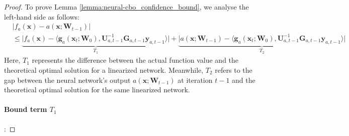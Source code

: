 \begin{proof}
To prove Lemma \ref{lemma:neural-cbo_confidence_bound}, we analyse the left-hand side as follows:
\begin{align*}
    & \lvert f_a(\mathbf{x}) - a(\mathbf{x}; \mathbf{W}_{t-1}) \rvert 
    \\
    & \le \underbrace{\lvert f_a(\mathbf{x}) - \langle \mathbf{g}_a(\mathbf{x}_{t};\mathbf{W}_{0}),\mathbf{U}_{a,t-1}^{-1}\mathbf{G}_{a,t-1}\mathbf{y}_{a,t-1} \rangle  \rvert}_{T_1} + \underbrace{\lvert a(\mathbf{x}; \mathbf{W}_{t-1}) - \langle \mathbf{g}_a(\mathbf{x}_{t};\mathbf{W}_{0}),\mathbf{U}_{a,t-1}^{-1}\mathbf{G}_{a,t-1}\mathbf{y}_{a,t-1} \rangle  \rvert}_{T_2}
\end{align*}
Here, $T_1$ represents the difference between the actual function value and the theoretical optimal solution for a linearized network. Meanwhile, $T_2$ refers to the gap between the neural network's output $a(\mathbf{x}; \boldsymbol{W}_{t-1})$ at iteration $t-1$ and the theoretical optimal solution for the same linearized network.
\paragraph{Bound term $T_1$}:


\end{proof}
